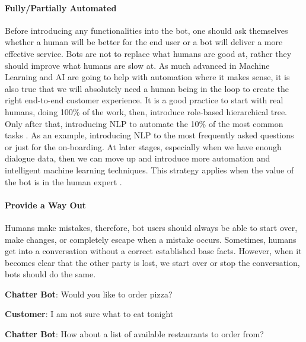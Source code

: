 \paragraph{Fully/Partially Automated}
Before introducing any functionalities into the bot, one should ask themselves whether a human will be better for the end user or a bot will deliver a more effective service. Bots are not to replace what humans are good at, rather they should improve what humans are slow at. As much advanced in Machine Learning and AI are going to help with automation where it makes sense, it is also true that we will absolutely need a human being in the loop to create the right end-to-end customer experience. It is a good practice to start with real humans, doing 100\% of the work, then, introduce role-based hierarchical tree. Only after that, introducing NLP to automate the 10\% of the most common tasks \cite{fadhil2018}. As an example, introducing NLP to the most frequently asked questions or just for the on-boarding. At later stages, especially when we have enough dialogue data, then we can move up and introduce more automation and intelligent machine learning techniques. This strategy applies when the value of the bot is in the human expert \cite{khan2018}.

\paragraph{Provide a Way Out}
Humans make mistakes, therefore, bot users should always be able to start over, make changes, or completely escape when a mistake occurs. Sometimes, humans get into a conversation without a correct established base facts. However, when it becomes clear that the other party is lost, we start over or stop the conversation, bots should do the same.\\

{ \selectfont
 
  \color{red}
  \textbf{Chatter Bot}: Would you like to order pizza? 
  \bigskip
  
  \color{blue}
  \textbf{Customer}: I am not sure what to eat tonight 
  \bigskip
  
  \color{red}
  \textbf{Chatter Bot}: How about a list of available restaurants to order from?
  
  \color{black}
}




